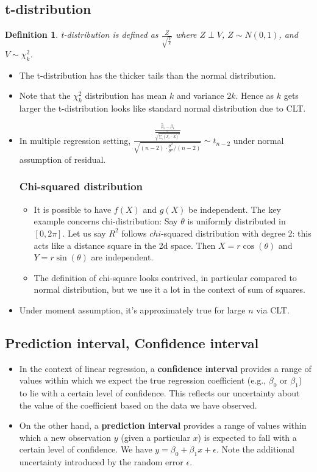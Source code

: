 \documentclass{article}
\newtheorem{definition}{Definition}
\theoremstyle{remark}
\begin{document}
\subsection{t-distribution}
\begin{definition}
t-distribution is defined as $\frac Z{\sqrt{\frac Vk}}$ where $Z \perp V$, $Z\sim N(0,1)$, and $V\sim \chi_k^2$.
\end{definition}
\begin{itemize}
\item The t-distribution has the thicker tails than the normal distribution.
\item Note that the $\chi_k^2$ distribution has mean $k$ and variance $2k$. Hence as $k$ gets larger the t-distribution 
looks like standard normal distribution due to CLT. 
\item In multiple regression setting, $\frac{\frac{\hat\beta_1-\beta_1}{\frac \sigma{\sqrt{\sum_i(X_i-\bar X)^2}}}}{\sqrt{(n-2)\cdot\frac{\hat \sigma^2}{\sigma^2}/(n-2)}}\sim t_{n-2}$ under normal assumption of residual.
\subsubsection{Chi-squared distribution}
\begin{itemize}
\item It is possible to have $f(X)$ and $g(X)$ be independent. The key example concerns chi-distribution: Say $\theta$ is uniformly distributed in $[0,2\pi]$. 
Let us say $R^2$ follows $chi$-squared distribution with degree 2: this acts like a distance square in the 2d space. Then $X= r\cos(\theta)$ and $Y=r\sin(\theta)$ are independent.
\item The definition of chi-square looks contrived, in particular compared to normal distribution, but we use it a lot in the context of sum of squares.
\end{itemize}
\item Under moment assumption, it's approximately true for large $n$ via CLT.
\end{itemize}

\subsection{Prediction interval, Confidence interval}
\begin{itemize}
\item In the context of linear regression, a \textbf{confidence interval} provides a range of values within which we expect the true regression coefficient (e.g., $ \beta_0 $ or $ \beta_1 $) to lie with a certain level of confidence. This reflects our uncertainty about the 
value of the coefficient based on the data we have observed.
\item On the other hand, a \textbf{prediction interval} provides a range of values within which a new observation $ y $ (given a particular $ x $) is expected to fall with a certain level of confidence.
 We have $y=\beta_0+\beta_1 x+\epsilon$. Note the additional uncertainty introduced by the random error $\epsilon$.
\end{itemize}
\end{document}
